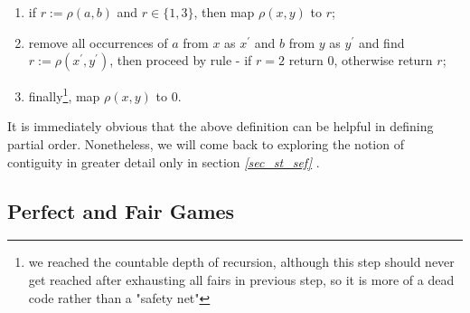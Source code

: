 \begin{definition}
\begin{enumerate}
\begin{enumerate}
\begin{enumerate}
          \item if $r := \rho(a, b)$ and $r \in \{1, 3\}$, then map $\rho(x,y)$ to $r$;
          \item remove all occurrences of $a$ from $x$ as $x^\prime$ and $b$ from $y$ as $y^\prime$ and find $r := \rho(x^\prime, y^\prime)$, then proceed by rule - if $r = 2$ return $0$, otherwise return $r$;
          \item finally\footnote{we reached the countable depth of recursion, although this step should never get reached after exhausting all fairs in previous step, so it is more of a dead code rather than a "safety net"}, map $\rho(x,y)$ to $0$.
        \end{enumerate}
      \end{enumerate}
  \end{enumerate}
\end{definition}


It is immediately obvious that the above definition can be helpful in defining partial order. Nonetheless, we will come back to exploring the notion of contiguity in greater detail only in section \textit{\ref{sec_st_sef} }.





\subsection{Perfect and Fair Games}

